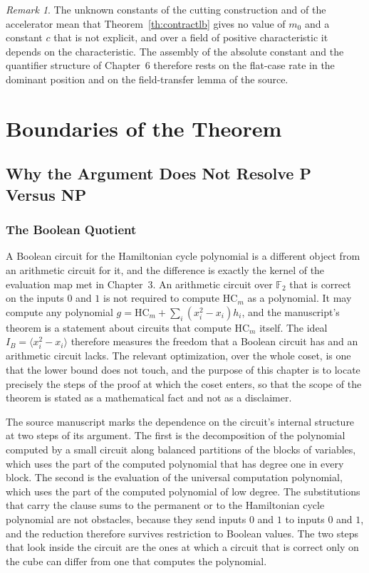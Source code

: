 \documentclass[11pt,letterpaper]{report}
\theoremstyle{plain}
\theoremstyle{definition}
\theoremstyle{remark}
\newtheorem{remark}[theorem]{Remark}
\begin{document}
\begin{remark}
The unknown constants of the cutting construction and of the accelerator mean that Theorem~\ref{th:contractlb} gives no value of $m_0$ and a constant $c$ that is not explicit, and over a field of positive characteristic it depends on the characteristic. The assembly of the absolute constant and the quantifier structure of Chapter~6 therefore rests on the flat-case rate in the dominant position and on the field-transfer lemma of the source.
\end{remark}

\part{Boundaries of the Theorem}

\chapter{Why the Argument Does Not Resolve P Versus NP}

\section{The Boolean Quotient}

A Boolean circuit for the Hamiltonian cycle polynomial is a different object from an arithmetic circuit for it, and the difference is exactly the kernel of the evaluation map met in Chapter~3. An arithmetic circuit over $\mathbb F_2$ that is correct on the inputs $0$ and $1$ is not required to compute $\mathrm{HC}_m$ as a polynomial. It may compute any polynomial $g=\mathrm{HC}_m+\sum_i(x_i^2-x_i)h_i$, and the manuscript's theorem is a statement about circuits that compute $\mathrm{HC}_m$ itself. The ideal $I_B=\langle x_i^2-x_i\rangle$ therefore measures the freedom that a Boolean circuit has and an arithmetic circuit lacks. The relevant optimization, over the whole coset, is one that the lower bound does not touch, and the purpose of this chapter is to locate precisely the steps of the proof at which the coset enters, so that the scope of the theorem is stated as a mathematical fact and not as a disclaimer.

The source manuscript marks the dependence on the circuit's internal structure at two steps of its argument. The first is the decomposition of the polynomial computed by a small circuit along balanced partitions of the blocks of variables, which uses the part of the computed polynomial that has degree one in every block. The second is the evaluation of the universal computation polynomial, which uses the part of the computed polynomial of low degree. The substitutions that carry the clause sums to the permanent or to the Hamiltonian cycle polynomial are not obstacles, because they send inputs $0$ and $1$ to inputs $0$ and $1$, and the reduction therefore survives restriction to Boolean values. The two steps that look inside the circuit are the ones at which a circuit that is correct only on the cube can differ from one that computes the polynomial.
\end{document}

